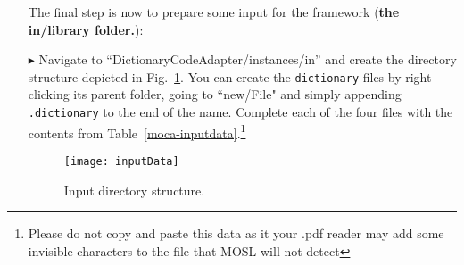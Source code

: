 \begin{enumerate}
\newpage

The final step is now to prepare some input for the framework ({\bf the in/library folder.}):


\item[$\blacktriangleright$] Navigate to ``DictionaryCodeAdapter/instances/in'' and create the directory structure depicted in Fig.~\ref{eclipse:textDirectory}. You can
create the \texttt{dictionary} files by right-clicking its parent folder, going to ``new/File" and simply appending \texttt{.dictionary} to the end of the name.
Complete each of the four files with the contents from Table~\ref{moca-inputdata}.\footnote{Please do not copy and paste this data as it your .pdf reader may
add some invisible characters to the file that MOSL will not detect}
 
\begin{figure}[htp]
\begin{center}
  \texttt{[image: inputData]}
  \caption{Input directory structure.}
  \label{eclipse:textDirectory}
\end{center}
\end{figure}

\end{enumerate}

\newpage

